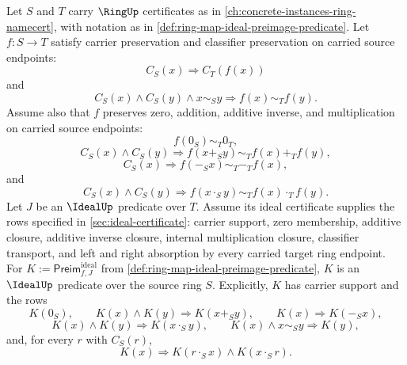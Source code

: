 \begin{theorem}
\label{thm:ring-map-ideal-preimage-ideal-closure}
Let $S$ and $T$ carry $\RingUp$ certificates as in \autoref{ch:concrete-instances-ring-namecert}, with notation as in \autoref{def:ring-map-ideal-preimage-predicate}. Let $f:S\to T$ satisfy carrier preservation and classifier preservation on carried source endpoints:
$$
C_S(x)\Longrightarrow C_T(f(x))
$$
and
$$
C_S(x)\land C_S(y)\land x\sim_S y\Longrightarrow f(x)\sim_T f(y).
$$
Assume also that $f$ preserves zero, addition, additive inverse, and multiplication on carried source endpoints:
$$
f(0_S)\sim_T0_T,
$$
$$
C_S(x)\land C_S(y)\Longrightarrow f(x+_S y)\sim_T f(x)+_T f(y),
$$
$$
C_S(x)\Longrightarrow f(-_S x)\sim_T -_T f(x),
$$
and
$$
C_S(x)\land C_S(y)\Longrightarrow f(x\cdot_S y)\sim_T f(x)\cdot_T f(y).
$$
Let $J$ be an $\IdealUp$ predicate over $T$. Assume its ideal certificate supplies the rows specified in \autoref{sec:ideal-certificate}: carrier support, zero membership, additive closure, additive inverse closure, internal multiplication closure, classifier transport, and left and right absorption by every carried target ring endpoint. For $K:=\mathsf{Preim}^{\mathrm{ideal}}_{f,J}$ from \autoref{def:ring-map-ideal-preimage-predicate}, $K$ is an $\IdealUp$ predicate over the source ring $S$. Explicitly, $K$ has carrier support and the rows
$$
K(0_S),\qquad K(x)\land K(y)\Longrightarrow K(x+_S y),\qquad K(x)\Longrightarrow K(-_S x),
$$
$$
K(x)\land K(y)\Longrightarrow K(x\cdot_S y),\qquad K(x)\land x\sim_S y\Longrightarrow K(y),
$$
and, for every $r$ with $C_S(r)$,
$$
K(x)\Longrightarrow K(r\cdot_S x)\land K(x\cdot_S r).
$$
\end{theorem}
